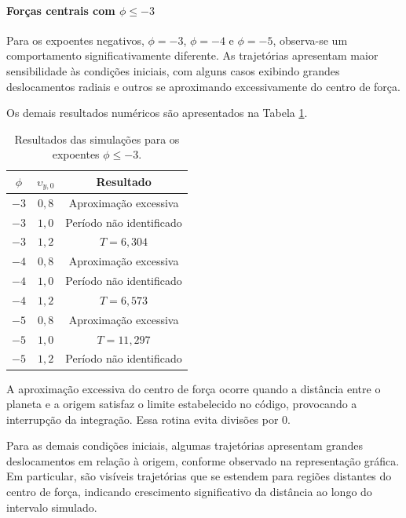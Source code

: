 \documentclass[12pt,a4paper]{article}
\begin{document}
\paragraph{Forças centrais com $\phi\leq-3$}

Para os expoentes negativos, $\phi=-3$, $\phi=-4$ e $\phi=-5$, observa-se um comportamento significativamente diferente. As trajetórias apresentam maior sensibilidade às condições iniciais, com alguns casos exibindo grandes deslocamentos radiais e outros se aproximando excessivamente do centro de força.

Os demais resultados numéricos são apresentados na Tabela \ref{tab:periodos-phi-negativo}.

\begin{table}[htbp]
    \centering
    \caption{Resultados das simulações para os expoentes $\phi\leq-3$.}
    \label{tab:periodos-phi-negativo}
    \begin{tabular}{c c c}
        \hline
        $\phi$ & $\upsilon_{y,0}$ & Resultado \\
        \hline
        $-3$ & $0,8$ & Aproximação excessiva \\
        $-3$ & $1,0$ & Período não identificado \\
        $-3$ & $1,2$ & $T=6,304$ \\
        $-4$ & $0,8$ & Aproximação excessiva \\
        $-4$ & $1,0$ & Período não identificado \\
        $-4$ & $1,2$ & $T=6,573$ \\
        $-5$ & $0,8$ & Aproximação excessiva \\
        $-5$ & $1,0$ & $T=11,297$ \\
        $-5$ & $1,2$ & Período não identificado \\
        \hline
    \end{tabular}
\end{table}

A aproximação excessiva do centro de força ocorre quando a distância entre o planeta e a origem satisfaz o limite estabelecido no código, provocando a interrupção da integração. Essa rotina evita divisões por $0$.

Para as demais condições iniciais, algumas trajetórias apresentam grandes deslocamentos em relação à origem, conforme observado na representação gráfica. Em particular, são visíveis trajetórias que se estendem para regiões distantes do centro de força, indicando crescimento significativo da distância ao longo do intervalo simulado.
\end{document}
